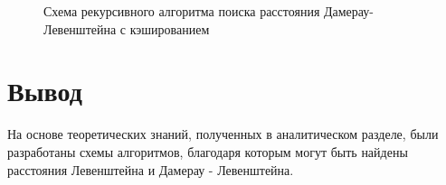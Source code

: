 \begin{figure}[h]
	
	
	\caption{Схема рекурсивного алгоритма поиска расстояния Дамерау-Левенштейна с кэшированием}
	
	\label{fig:recursiveCache}
	
\end{figure}

\section*{Вывод}

На основе теоретических знаний, полученных в аналитическом разделе, были разработаны схемы алгоритмов, благодаря которым могут быть найдены расстояния Левенштейна и Дамерау - Левенштейна. 
